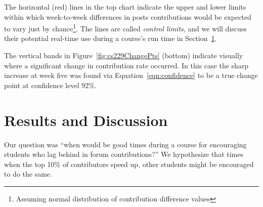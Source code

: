 The horizontal (red) lines in the top chart indicate the upper and
lower limits within which week-to-week differences in posts
contributions would be expected to vary just by
chance\footnote{Assuming normal distribution of contribution
  difference values}. The lines are called {\em control limits}, and
we will discuss their potential real-time use during a course's run
time in Section~\ref{sec:discussion}.

The vertical bands in Figure~\ref{fig:cs229ChangePts} (bottom)
indicate visually where a significant change in contribution rate
occurred. In this case the sharp increase at week five was found via
Equation~\ref{eqn:confidence} to be a true change point at confidence
level 92\%.

\section{Results and Discussion}
\label{sec:discussion}

Our question was ``when would be good times during a course for
encouraging students who lag behind in forum contributions?'' We
hypothesize that times when the top 10\% of contributors speed up,
other students might be encouraged to do the same.

